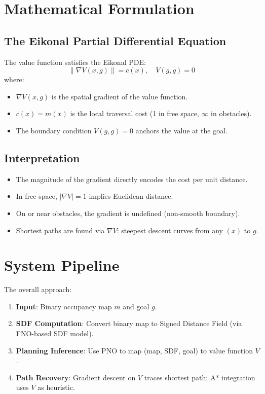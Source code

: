 \documentclass[11pt,a4paper]{article}
\theoremstyle{definition}
\begin{document}
\section{Mathematical Formulation}\label{sec:math}

\subsection{The Eikonal Partial Differential Equation}
The value function satisfies the Eikonal PDE:
\[
  \|\nabla V(x, g)\| = c(x), \quad V(g, g) = 0
\]
where:
\begin{itemize}
  \item $\nabla V(x, g)$ is the spatial gradient of the value function.
  \item $c(x) = m(x)$ is the local traversal cost (1 in free space, $\infty$ in obstacles).
  \item The boundary condition $V(g, g) = 0$ anchors the value at the goal.
\end{itemize}

\subsection{Interpretation}
\begin{itemize}
  \item The magnitude of the gradient directly encodes the cost per unit distance.
  \item In free space, $|\nabla V| = 1$ implies Euclidean distance. 
  \item On or near obstacles, the gradient is undefined (non-smooth boundary).
  \item Shortest paths are found via $\nabla V$: steepest descent curves from any $(x)$ to $g$.
\end{itemize}

\section{System Pipeline}\label{sec:pipeline}

\noindent
The overall approach:
\begin{enumerate}
  \item \textbf{Input}: Binary occupancy map $m$ and goal $g$.
  \item \textbf{SDF Computation}: Convert binary map to Signed Distance Field (via FNO-based SDF model).
  \item \textbf{Planning Inference}: Use PNO to map (map, SDF, goal) to value function $V$.
  \item \textbf{Path Recovery}: Gradient descent on $V$ traces shortest path; A* integration uses $V$ as heuristic.
\end{enumerate}
\end{document}
